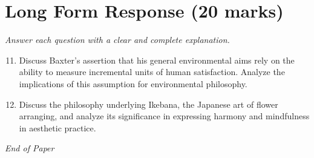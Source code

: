 \documentclass[12pt]{article}
\begin{document}
\section*{Long Form Response (20 marks)}
\textit{Answer each question with a clear and complete explanation.}
\begin{enumerate}[label=\arabic*.]
\setcounter{enumi}{10}
\item Discuss Baxter's assertion that his general environmental aims rely on the ability to
measure incremental units of human satisfaction. Analyze the implications of this
assumption for environmental philosophy.
\item Discuss the philosophy underlying Ikebana, the Japanese art of flower arranging, and
analyze its significance in expressing harmony and mindfulness in aesthetic practice.
\end{enumerate}

\vfill
\noindent\textit{End of Paper}
\end{document}
